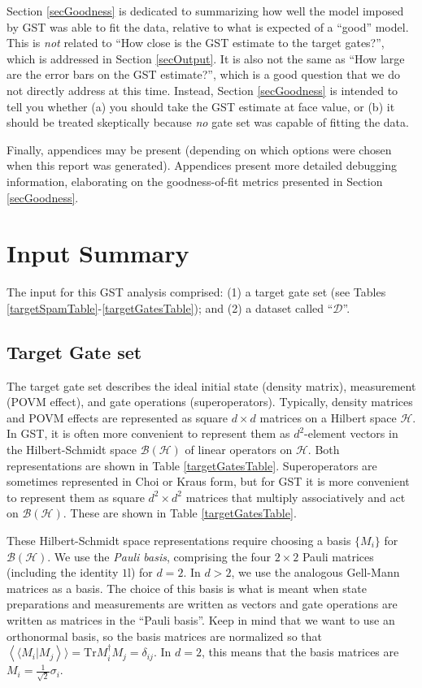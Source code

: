 \documentclass{article}[11pt]
\newcommand{\rrangle}{\rangle\!\rangle} \newcommand{\llangle}{\langle\!\langle}
\newcommand{\sbraket}[2]{\ensuremath{\left\llangle#1|#2\right\rrangle}}
\def\Id{1\!\mathrm{l}}
\newcommand{\Tr}[0]{\mathrm{Tr}}
\begin{document}
Section \ref{secGoodness} is dedicated to summarizing how well the model imposed by GST was able to fit the data, relative to what is expected of a ``good'' model.  This is \emph{not} related to ``How close is the GST estimate to the target gates?'', which is addressed in Section \ref{secOutput}.  It is also not the same as ``How large are the error bars on the GST estimate?'', which is a good question that we do not directly address at this time.  Instead, Section \ref{secGoodness} is intended to tell you whether (a) you should take the GST estimate at face value, or (b) it should be treated skeptically because \emph{no} gate set was capable of fitting the data.

Finally, appendices may be present (depending on which options were chosen when this report was generated).  Appendices present more detailed debugging information, elaborating on the goodness-of-fit metrics presented in Section \ref{secGoodness}.

\section{Input Summary\label{secInput}}
The input for this GST analysis comprised: (1) a target gate set (see Tables \ref{targetSpamTable}-\ref{targetGatesTable}); and (2) a dataset called ``$\mathcal{D}$''.

\subsection{Target Gate set}

The target gate set describes the ideal initial state (density matrix), measurement (POVM effect), and gate operations (superoperators).  Typically, density matrices and POVM effects are represented as square $d\times d$ matrices on a Hilbert space $\mathcal{H}$.  In GST, it is often more convenient to represent them as $d^2$-element vectors in the Hilbert-Schmidt space $\mathcal{B}(\mathcal{H})$ of linear operators on $\mathcal{H}$.  Both representations are shown in Table \ref{targetGatesTable}.  Superoperators are sometimes represented in Choi or Kraus form, but for GST it is more convenient to represent them as square $d^2\times d^2$ matrices that multiply associatively and act on $\mathcal{B}(\mathcal{H})$.  These are shown in Table \ref{targetGatesTable}.

These Hilbert-Schmidt space representations require choosing a basis $\{M_i\}$ for $\mathcal{B}(\mathcal{H})$.  We use the \emph{Pauli basis}, comprising the four $2\times2$ Pauli matrices (including the identity $\Id$) for $d=2$.  In $d>2$, we use the analogous Gell-Mann matrices as a basis.   The choice of this basis is what is meant when state preparations and measurements are written as vectors and gate operations are written as matrices in the ``Pauli basis''.  Keep in mind that we want to use an orthonormal basis, so the basis matrices are normalized so that $\sbraket{M_i}{M_j} = \Tr M_i^\dagger M_j = \delta_{ij}$.  In $d=2$, this means that the basis matrices are $M_i = \frac{1}{\sqrt{2}}\sigma_i$.
\end{document}
